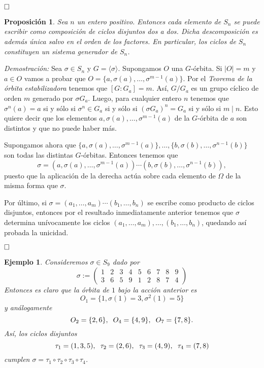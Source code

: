\documentclass[12pt]{article}
\newtheorem{proposition}[theorem]{Proposición}
\newtheorem{example}{Ejemplo}[theorem]
\begin{document}
$\hfill \square$

\begin{proposition}\label{eq:ciclosdis} Sea $n$ un entero positivo. Entonces cada elemento de $S_{n}$ se puede escribir como composición de ciclos disjuntos dos a dos. Dicha descomposición es además única salvo en el orden de los factores. En particular, los ciclos de $S_{n}$ constituyen un sistema generador de $S_{n}$.
\end{proposition}
\emph{Demostración: } 
Sea $\sigma \in S_{n}$ y $G= \langle \sigma \rangle$. Supongamos $O$ una $G$-órbita. Si $|O| = m$ y $a \in O$ vamos a probar que $O = \lbrace a, \sigma(a), \ldots, \sigma^{m-1}(a) \rbrace$. Por el \textit{Teorema de la órbita estabilizadora} tenemos que $[G:G_{a}] = m$. Así, $G/G_{a}$ es un grupo cíclico de orden $m$ generado por $\sigma G_{a}$. Luego, para cualquier entero $n$ tenemos que $\sigma^{n}(a) = a$ si y sólo si $\sigma^{n}\in G_{a}$ si y sólo si $(\sigma G_{a})^{n} = G_{a}$ si y sólo si $m \mid n$. Esto quiere decir que los elementos $a, \sigma(a), \ldots, \sigma^{m-1}(a)$ de la $G$-órbita de $a$ son distintos y que no puede haber más.

Supongamos ahora que $\lbrace a, \sigma(a), \ldots, \sigma^{m-1}(a) \rbrace, \ldots, \lbrace b, \sigma(b), \ldots, \sigma^{n-1}(b) \rbrace$ son todas las distintas $G$-órbitas. Entonces tenemos que $$\sigma = (a, \sigma(a), \ldots, \sigma^{m-1}(a))\cdots (b, \sigma(b), \ldots, \sigma^{n-1}(b)),$$ puesto que la aplicación de la derecha actúa sobre cada elemento de $\Omega$ de la misma forma que $\sigma$.

Por último, si $\sigma = (a_{1}, \ldots, a_{m}) \cdots(b_{1}, \ldots, b_{n})$ se escribe como producto de ciclos disjuntos, entonces por el resultado inmediatamente anterior tenemos que $\sigma$ determina unívocamente los ciclos $(a_{1}, \ldots, a_{m}), \ldots, (b_{1}, \ldots, b_{n})$, quedando así probada la unicidad.

$\hfill \square$

\begin{example}\label{eq:excidis} Consideremos $\sigma \in S_{9}$ dado por $$\sigma:= \left(\begin{matrix}
1 &2 &3 &4 &5 &6 &7 &8 &9 \\
3 &6 &5 &9 &1 &2 &8 &7 &4
\end{matrix}
\right)$$ Entonces es claro que la órbita de $1$ bajo la acción anterior es $$O_{1} = \lbrace 1, \sigma(1)=3, \sigma^{2}(1) = 5 \rbrace$$ y análogamente $$O_{2} = \lbrace 2,6 \rbrace, \hspace{0.2cm} O_{4} = \lbrace 4,9 \rbrace, \hspace{0.2cm} O_{7} = \lbrace 7,8 \rbrace.$$ Así, los ciclos disjuntos $$\tau_{1} = (1,3,5), \hspace{0.2cm} \tau_{2} = (2,6), \hspace{0.2cm} \tau_{3} = (4,9), \hspace{0.2cm} \tau_{4} = (7,8)$$ cumplen $\sigma = \tau_{1} \circ \tau_{2} \circ \tau_{3} \circ \tau_{4}$.

\end{example}
\end{document}
